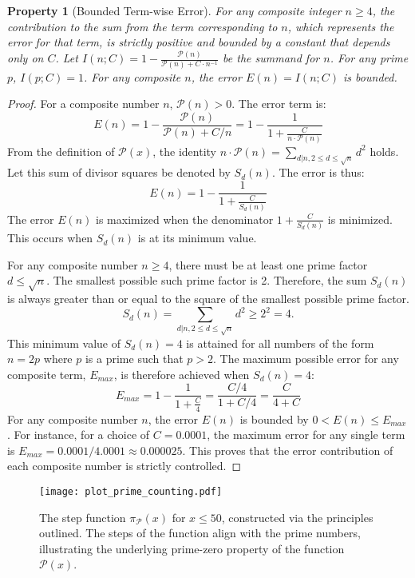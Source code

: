 \documentclass[11pt,a4paper]{amsart}
\newcommand{\Px}{\mathcal{P}}
\theoremstyle{plain}
\newtheorem{property}[theorem]{Property}
\theoremstyle{definition}
\begin{document}
\begin{property}[Bounded Term-wise Error]
For any composite integer $n \ge 4$, the contribution to the sum from the term corresponding to $n$, which represents the error for that term, is strictly positive and bounded by a constant that depends only on $C$.
Let $I(n; C) = 1 - \frac{\Px(n)}{\Px(n) + C \cdot n^{-1}}$ be the summand for $n$. For any prime $p$, $I(p; C) = 1$. For any composite $n$, the error $E(n) = I(n;C)$ is bounded.
\end{property}

\begin{proof}
For a composite number $n$, $\Px(n)>0$. The error term is:
\[ E(n) = 1 - \frac{\Px(n)}{\Px(n) + C/n} = 1 - \frac{1}{1 + \frac{C}{n \cdot \Px(n)}} \]
From the definition of $\Px(x)$, the identity $n \cdot \Px(n) = \sum_{d|n, 2\le d \le \sqrt{n}} d^2$ holds. Let this sum of divisor squares be denoted by $S_d(n)$. The error is thus:
\[ E(n) = 1 - \frac{1}{1 + \frac{C}{S_d(n)}} \]
The error $E(n)$ is maximized when the denominator $1 + \frac{C}{S_d(n)}$ is minimized. This occurs when $S_d(n)$ is at its minimum value.

For any composite number $n \ge 4$, there must be at least one prime factor $d \le \sqrt{n}$. The smallest possible such prime factor is 2. Therefore, the sum $S_d(n)$ is always greater than or equal to the square of the smallest possible prime factor.
\[ S_d(n) = \sum_{d|n, 2\le d \le \sqrt{n}} d^2 \ge 2^2 = 4. \]
This minimum value of $S_d(n)=4$ is attained for all numbers of the form $n=2p$ where $p$ is a prime such that $p>2$. The maximum possible error for any composite term, $E_{max}$, is therefore achieved when $S_d(n)=4$:
\[ E_{max} = 1 - \frac{1}{1 + \frac{C}{4}} = \frac{C/4}{1+C/4} = \frac{C}{4+C} \]
For any composite number $n$, the error $E(n)$ is bounded by $0 < E(n) \le E_{max}$. For instance, for a choice of $C=0.0001$, the maximum error for any single term is $E_{max} = 0.0001 / 4.0001 \approx 0.000025$. This proves that the error contribution of each composite number is strictly controlled.
\end{proof}

\begin{figure}[!htbp]
\centering
\texttt{[image: plot\_prime\_counting.pdf]}
\caption{The step function $\pi_\Px(x)$ for $x\le 50$, constructed via the principles outlined. The steps of the function align with the prime numbers, illustrating the underlying prime-zero property of the function $\Px(x)$.}
\label{fig:primecounting}
\end{figure}
\end{document}
